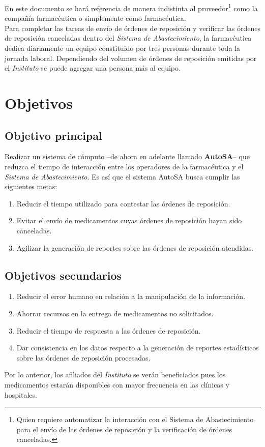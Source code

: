 En este documento se hará referencia de manera indistinta al proveedor\footnote{Quien requiere automatizar la interacción con el Sistema de Abastecimiento para el envío de las órdenes de reposición y la verificación de órdenes canceladas.} como la compañía farmacéutica o simplemente como farmacéutica.\\
Para completar las tareas de envío de órdenes de reposición y verificar las órdenes de reposición canceladas dentro del \textit{Sistema de Abastecimiento}, la farmacéutica dedica diariamente un equipo constituido por tres personas durante toda la jornada laboral. Dependiendo del volumen de órdenes de reposición emitidas por el \textit{Instituto} se puede agregar una persona más al equipo.

\section{Objetivos}
\subsection{Objetivo principal}\label{sec:objetivo-principal}
Realizar un sistema de cómputo --de ahora en adelante llamado \textbf{AutoSA}-- que reduzca el tiempo de interacción entre los operadores de la farmacéutica y el \textit{Sistema de Abastecimiento}. Es así que el sistema AutoSA busca cumplir las siguientes metas:
\begin{enumerate}
	\item Reducir el tiempo utilizado para contestar las órdenes de reposición.
	\item Evitar el envío de medicamentos cuyas órdenes de reposición hayan sido canceladas.
	\item Agilizar la generación de reportes sobre las órdenes de reposición atendidas.
\end{enumerate}

\subsection{Objetivos secundarios}\label{sec:objetivos-secundarios}
\begin{enumerate}
\item Reducir el error humano en relación a la manipulación de la información.
\item Ahorrar recursos en la entrega de medicamentos no solicitados.
\item Reducir el tiempo de respuesta a las órdenes de reposición.
\item Dar consistencia en los datos respecto a la generación de reportes estadísticos sobre las órdenes de reposición procesadas.
\end{enumerate}
Por lo anterior, los afiliados del \textit{Instituto} se verán beneficiados pues los medicamentos estarán disponibles con mayor frecuencia en las clínicas y hospitales.

